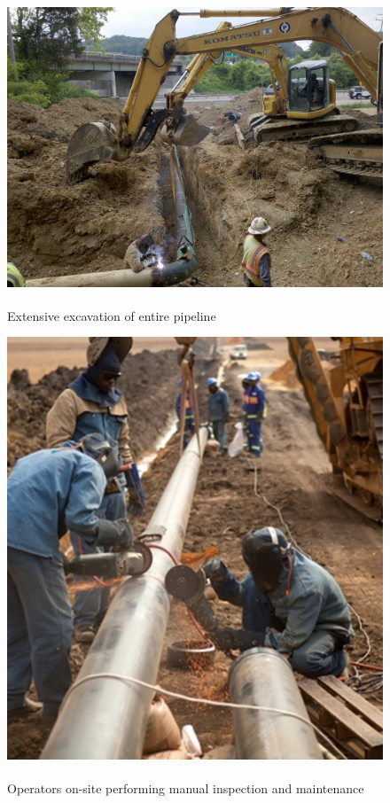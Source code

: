 \documentclass[11pt]{article}		%
\newlength{\imageheight}	 %
\newcommand{\supercite}[1]{\textsuperscript{\cite{#1}}}		%
\begin{document}
		\begin{figure}[h]
					\centering
					\begin{multicols}{2}
						\includegraphics[height=\imageheight]{Pipeline Excavation.jpg}
						\caption{Extensive excavation of entire pipeline\supercite{excavationpipeline}}
						\label{excavation}
						\columnbreak
						\includegraphics[height=\imageheight]{Pipeline Repair.jpg}
						\caption{Operators on-site performing manual inspection and maintenance\supercite{manualinspection}}
						\label{pipelineRepair}
					\end{multicols}
				\end{figure}
\end{document}
